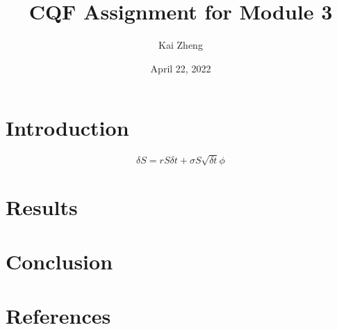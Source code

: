 \documentclass[UTF8]{ctexart}
\title{\vspace{-1cm}CQF Assignment for Module 3}
\author{Kai Zheng}
\date{April 22, 2022}
\begin{document}
\maketitle

\section {Introduction}


\begin{equation}\label{1}
    
	\delta S = rS\delta t + \sigma S \sqrt{\delta t}\phi
\end{equation}


\section {Results}


\section {Conclusion}


\section {References}
\end{document}
